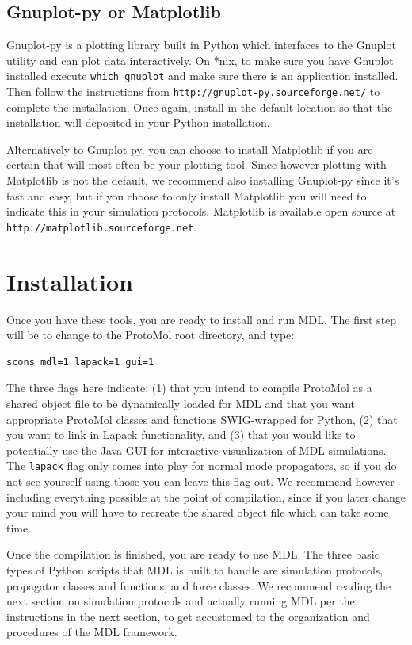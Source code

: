 \documentclass[11pt]{report}
\begin{document}
\subsection{Gnuplot-py or Matplotlib}

Gnuplot-py is a plotting library built in Python which
interfaces to the Gnuplot utility and can plot data
interactively.  On *nix, to make sure you have Gnuplot
installed execute \texttt{which gnuplot} and make sure
there is an application installed.  Then follow the 
instructions from \texttt{http://gnuplot-py.sourceforge.net/}
to complete the installation.  Once again, install in the default
location so that the installation will deposited in your
Python installation.

Alternatively to Gnuplot-py, you can choose to install
Matplotlib if you are certain that will most often be your
plotting tool.  Since however plotting with Matplotlib
is not the default, we recommend also installing Gnuplot-py
since it's fast and easy, but if you choose to only install
Matplotlib you will need to indicate this in your simulation
protocols.  Matplotlib is available open source at
\texttt{http://matplotlib.sourceforge.net}.

\section{Installation}

Once you have these tools, you are ready to install and
run MDL.  The first step will be to change to the ProtoMol
root directory, and type:

\begin{verbatim}
scons mdl=1 lapack=1 gui=1
\end{verbatim}

The three flags here indicate: (1) that you intend to compile
ProtoMol as a shared object file to be dynamically loaded for 
MDL and that you want appropriate ProtoMol classes and functions
SWIG-wrapped for Python, (2) that you want to link in Lapack \cite{}
functionality, and (3) that you would like to potentially
use the Java GUI for interactive visualization of MDL simulations.
The \texttt{lapack} flag only comes into play for normal
mode propagators, so if you do not see yourself using those you
can leave this flag out.  We recommend however including everything
possible at the point of compilation, since if you later change
your mind you will have to recreate the shared object file which
can take some time.

Once the compilation is finished, you are ready to use MDL.
The three basic types of Python scripts that MDL is built to handle
are simulation protocols, propagator classes and functions, and
force classes.  We recommend reading the next section on simulation
protocols and actually running MDL per the instructions in the
next section, to get accustomed to the organization and procedures
of the MDL framework.
\end{document}
